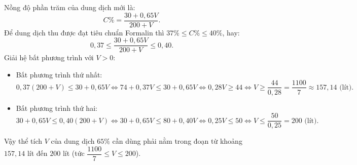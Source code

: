 \begin{bt}
{\begin{enumerate}[a)]
	Nồng độ phần trăm của dung dịch mới là:
	$$ C\% = \dfrac{30 + 0{,}65V}{200 + V}. $$
	Để dung dịch thu được đạt tiêu chuẩn Formalin thì $37\% \le C\% \le 40\%$, hay:
	$$ 0{,}37 \le \dfrac{30 + 0{,}65V}{200 + V} \le 0{,}40. $$
	Giải hệ bất phương trình với $V > 0$:
	\begin{itemize}
		\item Bất phương trình thứ nhất:
		$$ 0{,}37(200 + V) \le 30 + 0{,}65V \iff 74 + 0{,}37V \le 30 + 0{,}65V \iff 0{,}28V \ge 44 \iff V \ge \dfrac{44}{0{,}28} = \dfrac{1100}{7} \approx 157{,}14\text{ (lít)}. $$
		\item Bất phương trình thứ hai:
		$$ 30 + 0{,}65V \le 0{,}40(200 + V) \iff 30 + 0{,}65V \le 80 + 0{,}40V \iff 0{,}25V \le 50 \iff V \le \dfrac{50}{0{,}25} = 200\text{ (lít)}. $$
	\end{itemize}
	Vậy thể tích $V$ của dung dịch $65\%$ cần dùng phải nằm trong đoạn từ khoảng $157{,}14$ lít đến $200$ lít (tức $\dfrac{1100}{7} \le V \le 200$).
\end{enumerate}
}
\end{bt}

